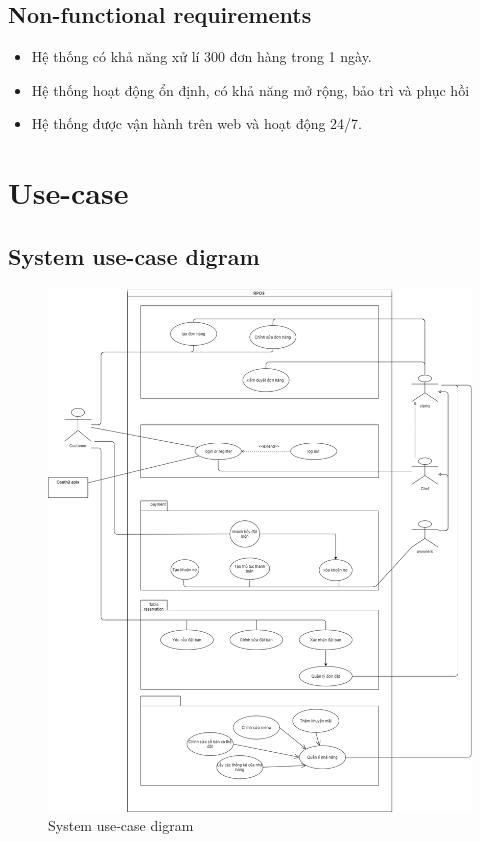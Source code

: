 \documentclass[a4paper]{article}
\begin{document}
\subsection{Non-functional requirements}
\begin{itemize}
    \item Hệ thống có khả năng xử lí 300 đơn hàng trong 1 ngày.
    \item Hệ thống hoạt động ổn định, có khả năng mở rộng, bảo trì và phục hồi
    \item Hệ thống được vận hành trên web và hoạt động 24/7.
\end{itemize}

\newpage
\section{Use-case}
\subsection{System use-case digram}

\begin{figure}[!h]
    \begin{center}
        \includegraphics[scale=0.33]{Images/system-use-case.png}
    \end{center}
    \caption{System use-case digram}
\end{figure}
\end{document}
